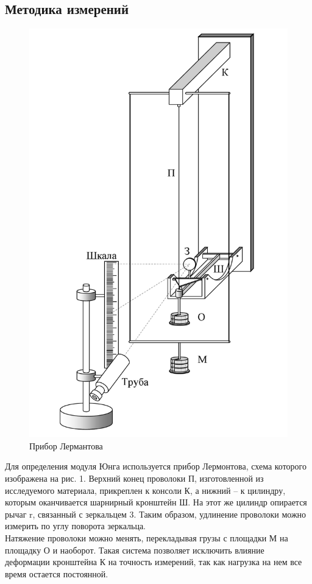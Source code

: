 \documentclass[12pt]{article}
\begin{document}
    \subsection{Методика измерений}
    \begin{figure}[H]
        \centering
        \includegraphics[scale = 0.3]{pictures/lermantov.png}
        \caption{Прибор Лермантова}
    \end{figure}

    Для определения модуля Юнга используется прибор Лермонтова,
    схема которого изображена на рис. 1. Верхний конец проволоки П, изготовленной
    из исследуемого материала, прикреплен к консоли К, а
    нижний -- к цилиндру, которым оканчивается шарнирный кронштейн
    Ш. На этот же цилиндр опирается рычаг r, связанный с зеркальцем
    3. Таким образом, удлинение проволоки можно измерить по углу
    поворота зеркальца.\\
    Натяжение проволоки можно менять, перекладывая грузы с
    площадки М на площадку О и наоборот. Такая система позволяет
    исключить влияние деформации кронштейна К на точность измерений, так
    как нагрузка на нем все время остается постоянной.
\end{document}
